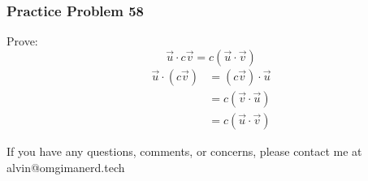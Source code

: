\documentclass[letterpaper, 12pt]{math}
\begin{document}
\subsubsection*{Practice Problem 58}
Prove:
\[ \vec{u}\cdot c\vec{v} = c(\vec{u}\cdot\vec{v}) \]
\begin{align*}
  \vec{u}\cdot(c\vec{v}) &= (c\vec{v})\cdot\vec{u} \\
  &= c(\vec{v}\cdot\vec{u}) \\
  &= c(\vec{u}\cdot\vec{v})
\end{align*}

\begin{center}
  If you have any questions, comments, or concerns, please contact me at
  alvin@omgimanerd.tech
\end{center}
\end{document}
